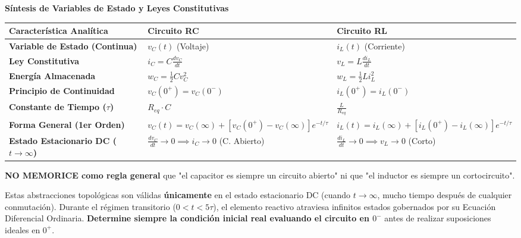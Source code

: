 \documentclass[11pt, a4paper]{article}
\begin{document}
\begin{tcolorbox}[colback=ucbblue!5!white, colframe=ucbblue, title=\textbf{Tabla de Referencia Analítica: Transitorios de Primer Orden (RC y RL)}]
    \centering \textbf{Síntesis de Variables de Estado y Leyes Constitutivas}
\end{tcolorbox}

\vspace{0.4cm}
\renewcommand{\arraystretch}{2}
\noindent
\begin{tabularx}{\textwidth}{>{\bfseries\RaggedRight}p{4cm} >{\centering\arraybackslash}X >{\centering\arraybackslash}X}
\toprule
\textbf{Característica Analítica} & \textbf{Circuito RC} & \textbf{Circuito RL} \\ 
\midrule
\textbf{Variable de Estado (Continua)} & $v_C(t)$ (Voltaje) & $i_L(t)$ (Corriente) \\ 
\textbf{Ley Constitutiva} & $i_C = C \frac{dv_C}{dt}$ & $v_L = L \frac{di_L}{dt}$ \\ 
\textbf{Energía Almacenada} & $w_C = \frac{1}{2} C v_C^2$ & $w_L = \frac{1}{2} L i_L^2$ \\ 
\textbf{Principio de Continuidad} & $v_C(0^+) = v_C(0^-)$ & $i_L(0^+) = i_L(0^-)$ \\ 
\textbf{Constante de Tiempo ($\tau$)} & $R_{eq} \cdot C$ & $\frac{L}{R_{eq}}$ \\ 
\textbf{Forma General (1er Orden)} & $v_C(t) = v_C(\infty) + [v_C(0^+) - v_C(\infty)]e^{-t/\tau}$ & $i_L(t) = i_L(\infty) + [i_L(0^+) - i_L(\infty)]e^{-t/\tau}$ \\ 
\textbf{Estado Estacionario DC ($t \to \infty$)} & $\frac{dv_C}{dt} \to 0 \implies i_C \to 0$ (C. Abierto) & $\frac{di_L}{dt} \to 0 \implies v_L \to 0$ (Corto) \\ 
\bottomrule
\end{tabularx}

\vspace{0.8cm}
\begin{tcolorbox}[colback=red!5!white, colframe=red!70!black, title=\textbf{Precaución Crítica de Análisis}]
\textbf{NO MEMORICE como regla general} que "el capacitor es siempre un circuito abierto" ni que "el inductor es siempre un cortocircuito". 

Estas abstracciones topológicas son válidas \textbf{únicamente} en el estado estacionario DC (cuando $t \to \infty$, mucho tiempo después de cualquier conmutación). Durante el régimen transitorio ($0 < t < 5\tau$), el elemento reactivo atraviesa infinitos estados gobernados por su Ecuación Diferencial Ordinaria. \textbf{Determine siempre la condición inicial real evaluando el circuito en $0^-$} antes de realizar suposiciones ideales en $0^+$.
\end{tcolorbox}
\end{document}
